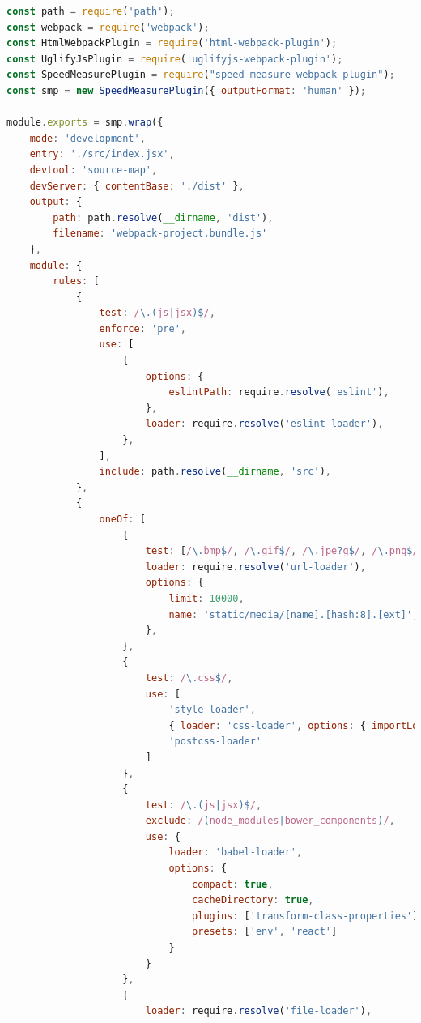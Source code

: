 \documentclass[11pt]{report}
\begin{document}
    \begin{lstlisting}[language=JavaScript,label={figure:baselineConfiguration},caption={Ausgangskonfiguration für Webpack 4 (webpack.config.js)}]
const path = require('path');
const webpack = require('webpack');
const HtmlWebpackPlugin = require('html-webpack-plugin');
const UglifyJsPlugin = require('uglifyjs-webpack-plugin');
const SpeedMeasurePlugin = require("speed-measure-webpack-plugin");
const smp = new SpeedMeasurePlugin({ outputFormat: 'human' });

module.exports = smp.wrap({
    mode: 'development',
    entry: './src/index.jsx',
    devtool: 'source-map',
    devServer: { contentBase: './dist' },
    output: {
        path: path.resolve(__dirname, 'dist'),
        filename: 'webpack-project.bundle.js'
    },
    module: {
        rules: [
            {
                test: /\.(js|jsx)$/,
                enforce: 'pre',
                use: [
                    {
                        options: {
                            eslintPath: require.resolve('eslint'),
                        },
                        loader: require.resolve('eslint-loader'),
                    },
                ],
                include: path.resolve(__dirname, 'src'),
            },
            {
                oneOf: [
                    {
                        test: [/\.bmp$/, /\.gif$/, /\.jpe?g$/, /\.png$/],
                        loader: require.resolve('url-loader'),
                        options: {
                            limit: 10000,
                            name: 'static/media/[name].[hash:8].[ext]',
                        },
                    },
                    {
                        test: /\.css$/,
                        use: [
                            'style-loader',
                            { loader: 'css-loader', options: { importLoaders: 1 } },
                            'postcss-loader'
                        ]
                    },
                    {
                        test: /\.(js|jsx)$/,
                        exclude: /(node_modules|bower_components)/,
                        use: {
                            loader: 'babel-loader',
                            options: {
                                compact: true,
                                cacheDirectory: true,
                                plugins: ['transform-class-properties'],
                                presets: ['env', 'react']
                            }
                        }
                    },
                    {
                        loader: require.resolve('file-loader'),

\end{lstlisting}
\end{document}
